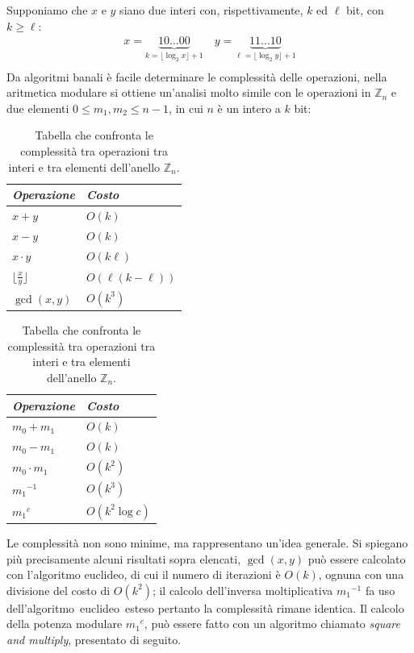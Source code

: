     \vspace{1em}\noindent 
    Supponiamo che $x$ e $y$ siano due interi con, rispettivamente, $k$ ed $\ell$ bit, con $k \geq \ell$:
    \begin{align*}
        x = \underbrace{{10\dots00}}_{k = \lfloor \log_2{x} \rfloor + 1} \quad y = \underbrace{{11\dots10}}_{\ell = \lfloor \log_2{y} \rfloor + 1}\\
    \end{align*}
    Da algoritmi banali è facile determinare le complessità delle operazioni, nella aritmetica modulare si ottiene un'analisi molto simile con le operazioni in $\mathbb{Z}_n $ e due elementi $0 \leq m_1,m_2 \leq n-1$, in cui $n$ è un intero a $k$ bit:

    \begin{table}[h]
        \centering
        \begin{tabular}{|l|l|}
            \hline
            \textit{Operazione} & \textit{Costo}\\
            \hline
            $x + y$ & $O(k)$\\
            $x-y$ & $O(k)$\\
            $x \cdot y$ & $O(k \ell)$\\
            $\lfloor \frac{x}{y} \rfloor$ & $O(\ell(k - \ell))$\\
            $\gcd(x,y)$ & $O(k^3)$\\
            \hline
        \end{tabular}
        \qquad 
        \begin{tabular}{|l|l|}
            \hline
            \textit{Operazione} & \textit{Costo}\\
            \hline
            $m_0 + m_1$ & $O(k)$\\
            $m_0-m_1$ & $O(k)$\\
            $m_0 \cdot m_1$ & $O(k^2)$\\
            ${m_1}^{-1}$ & $O(k^3)$\\
            ${m_1}^c$ & $O(k^2 \log c )$\\
            \hline
        \end{tabular}
    \caption{Tabella che confronta le complessità tra operazioni tra interi e tra elementi dell'anello $\mathbb{Z}_n$.}
    \label{tab:1}
    \end{table}

Le complessità non sono minime, ma rappresentano un'idea generale. Si spiegano più precisamente alcuni risultati sopra elencati, $\gcd(x,y)$ può essere calcolato con l'algoritmo euclideo, di cui il numero di iterazioni è $O(k)$, ognuna con una divisione del costo di $O(k^2)$; il calcolo dell'inversa moltiplicativa ${m_1}^{-1}$ fa uso dell'algoritmo~euclideo~esteso pertanto la complessità rimane identica. Il calcolo della potenza modulare ${m_1}^c$, può essere fatto con un algoritmo chiamato \textit{square and multiply}, presentato di seguito.

